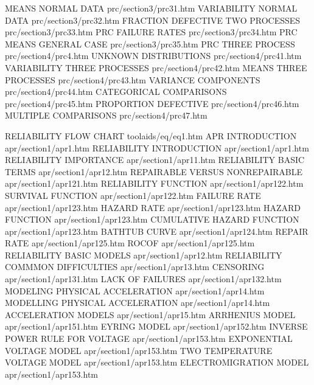 MEANS NORMAL DATA                       prc/section3/prc31.htm
VARIABILITY NORMAL DATA                 prc/section3/prc32.htm
FRACTION DEFECTIVE TWO PROCESSES        prc/section3/prc33.htm
PRC FAILURE RATES                       prc/section3/prc34.htm
PRC MEANS GENERAL CASE                  prc/section3/prc35.htm
PRC THREE PROCESS                       prc/section4/prc4.htm
UNKNOWN DISTRIBUTIONS                   prc/section4/prc41.htm
VARIABILITY THREE PROCESSES             prc/section4/prc42.htm
MEANS THREE PROCESSES                   prc/section4/prc43.htm
VARIANCE COMPONENTS                     prc/section4/prc44.htm
CATEGORICAL COMPARISONS                 prc/section4/prc45.htm
PROPORTION DEFECTIVE                    prc/section4/prc46.htm
MULTIPLE COMPARISONS                    prc/section4/prc47.htm

RELIABILITY FLOW CHART                  toolaids/eq/eq1.htm
APR INTRODUCTION                        apr/section1/apr1.htm
RELIABILITY INTRODUCTION                apr/section1/apr1.htm
RELIABILITY IMPORTANCE                  apr/section1/apr11.htm
RELIABILITY BASIC TERMS                 apr/section1/apr12.htm
REPAIRABLE VERSUS NONREPAIRABLE         apr/section1/apr121.htm
RELIABILITY FUNCTION                    apr/section1/apr122.htm
SURVIVAL FUNCTION                       apr/section1/apr122.htm
FAILURE RATE                            apr/section1/apr123.htm
HAZARD RATE                             apr/section1/apr123.htm
HAZARD FUNCTION                         apr/section1/apr123.htm
CUMULATIVE HAZARD FUNCTION              apr/section1/apr123.htm
BATHTUB CURVE                           apr/section1/apr124.htm
REPAIR RATE                             apr/section1/apr125.htm
ROCOF                                   apr/section1/apr125.htm
RELIABILITY BASIC MODELS                apr/section1/apr12.htm
RELIABILITY COMMMON DIFFICULTIES        apr/section1/apr13.htm
CENSORING                               apr/section1/apr131.htm
LACK OF FAILURES                        apr/section1/apr132.htm
MODELING PHYSICAL ACCELERATION          apr/section1/apr14.htm
MODELLING PHYSICAL ACCELERATION         apr/section1/apr14.htm
ACCELERATION MODELS                     apr/section1/apr15.htm
ARRHENIUS MODEL                         apr/section1/apr151.htm
EYRING MODEL                            apr/section1/apr152.htm
INVERSE POWER RULE FOR VOLTAGE          apr/section1/apr153.htm
EXPONENTIAL VOLTAGE MODEL               apr/section1/apr153.htm
TWO TEMPERATURE VOLTAGE MODEL           apr/section1/apr153.htm
ELECTROMIGRATION MODEL                  apr/section1/apr153.htm
